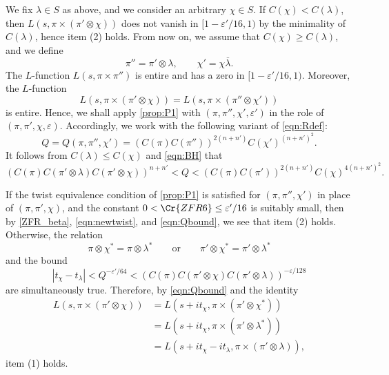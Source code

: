 \documentclass[12pt]{amsart}
\theoremstyle{definition}
\theoremstyle{remark}
\numberwithin{equation}{section}
\theoremstyle{plain}
\renewcommand{\bar}{\overline}
\renewcommand{\epsilon}{\varepsilon}
\begin{document}
We fix $\lambda\in S$ as above, and we consider an arbitrary $\chi\in S$. If $C(\chi)<C(\lambda)$, then $L(s,\pi\times(\pi'\otimes\chi))$ does not vanish in $[1-\epsilon'/16,1)$ by the minimality of $C(\lambda)$, hence item (2) holds. From now on, we assume that $C(\chi)\geq C(\lambda)$, and we define
\[
\pi''=\pi'\otimes\lambda,\qquad \chi'=\chi\bar{\lambda}.
\]
The $L$-function $L(s,\pi\times\pi'')$ is entire and has a zero in $[1-\epsilon'/16,1)$. Moreover, the $L$-function
\begin{equation}\label{eqn:newtwist}
L(s,\pi\times(\pi'\otimes\chi))=L(s,\pi\times(\pi''\otimes\chi'))
\end{equation}
is entire. Hence, we shall apply \cref{prop:P1} with $(\pi,\pi'',\chi',\epsilon')$ in the role of $(\pi,\pi',\chi,\epsilon)$. Accordingly, we work with the following variant of \eqref{eqn:Rdef}:
\[
Q=Q(\pi,\pi'',\chi')=(C(\pi)C(\pi''))^{2(n+n')}C(\chi')^{(n+n')^2}.
\]
It follows from  $C(\lambda)\leq C(\chi)$ and \eqref{eqn:BH} that
\begin{equation}
\label{eqn:Qbound}
(C(\pi)C(\pi'\otimes\lambda)C(\pi'\otimes\chi))^{n+n'}<Q<(C(\pi)C(\pi'))^{2(n+n')}C(\chi)^{4(n+n')^2}.
\end{equation}

If the twist equivalence condition of \cref{prop:P1} is satisfied for $(\pi,\pi'',\chi')$ in place of $(\pi,\pi',\chi)$, and the constant $0<\Cr{ZFR6}\leq\epsilon'/16$ is suitably small, then by \eqref{ZFR_beta}, \eqref{eqn:newtwist}, and \eqref{eqn:Qbound}, we see that item (2) holds. Otherwise,
the relation
\[
\pi\otimes\chi^*=\pi\otimes\lambda^*\qquad\text{or}\qquad\pi'\otimes\chi^*=\pi'\otimes\lambda^*
\]
and the bound 
\[
|t_\chi-t_{\lambda}|<Q^{-\epsilon'/64}<(C(\pi)C(\pi'\otimes\chi)C(\pi'\otimes\lambda))^{-\epsilon/128}
\]
are simultaneously true. Therefore, by \eqref{eqn:Qbound} and the identity
\begin{align*}
L(s,\pi\times(\pi'\otimes\chi))
&=L(s+it_\chi,\pi\times(\pi'\otimes\chi^*))\\
&=L(s+it_\chi,\pi\times(\pi'\otimes\lambda^*))\\
&=L(s+it_\chi-it_{\lambda},\pi\times(\pi'\otimes\lambda)),
\end{align*}
item (1) holds. 
\end{document}

